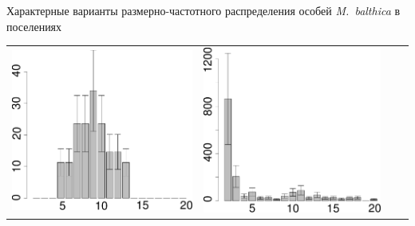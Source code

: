 \documentclass{beamer}
\begin{document}
\begin{frame}{Характерные варианты размерно-частотного распределения особей {\it M.~balthica} в поселениях}
\begin{tabularx}{\linewidth}{XX|XX}
			\includegraphics[width=\linewidth]{high_beatch2_1992_.pdf} &
			\includegraphics[width=\linewidth]{zostera_zone2_1998_.pdf}  \\

\end{tabularx}
\end{frame}
\end{document}
